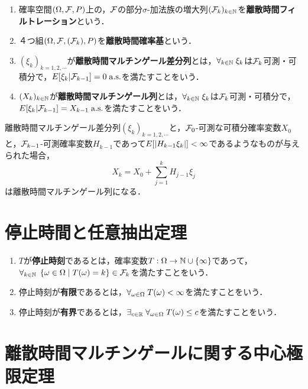 \documentclass[uplatex,dvipdfmx]{jsreport}
\begin{document}
\begin{definition}[filtration]\mbox{}
    \begin{enumerate}
        \item 確率空間$(\Omega,\mathcal{F},P)$上の，$\mathcal{F}$の部分$\sigma$-加法族の増大列$(\mathcal{F}_k)_{k\in\mathbb{N}}$を\textbf{離散時間フィルトレーション}という．
        \item ４つ組$(\Omega,\mathcal{F},(\mathcal{F}_k),P)$を\textbf{離散時間確率基}という．
        \item $(\xi_k)_{k=1,2,\cdots}$が\textbf{離散時間マルチンゲール差分列}とは，$\forall_{k\in\mathbb{N}}\;\xi_k$は$\mathcal{F}_k$可測・可積分で，$E[\xi_k|\mathcal{F}_{k-1}]=0\;\mathrm{a.s.}$を満たすことをいう．
        \item $(X_k)_{k\in\mathbb{N}}$が\textbf{離散時間マルチンゲール列}とは，$\forall_{k\in\mathbb{N}}\;\xi_k$は$\mathcal{F}_k$可測・可積分で，$E[\xi_k|\mathcal{F}_{k-1}]=X_{k-1}\;\mathrm{a.s.}$を満たすことをいう．
    \end{enumerate}
\end{definition}

\begin{lemma}
    離散時間マルチンゲール差分列$(\xi_k)_{k=1,2,\cdots}$と，$\mathcal{F}_0$-可測な可積分確率変数$X_0$と，$\mathcal{F}_{k-1}$-可測確率変数$H_{k-1}$であって$E[\lvert H_{k-1}\xi_k\rvert]<\infty$であるようなものが与えられた場合，
    \[X_k=X_0+\sum^k_{j=1}H_{j-1}\xi_j\]
    は離散時間マルチンゲール列になる．
\end{lemma}

\section{停止時間と任意抽出定理}

\begin{definition}\mbox{}
    \begin{enumerate}
        \item $T$が\textbf{停止時刻}であるとは，確率変数$T:\Omega\to\mathbb{N}\cup\{\infty\}$であって，$\forall_{k\in\mathbb{N}}\;\left\{\omega\in\Omega\mid T(\omega)=k\right\}\in\mathcal{F}_k$を満たすことをいう．
        \item 停止時刻が\textbf{有限}であるとは，$\forall_{\omega\in\Omega}\;T(\omega)<\infty$を満たすことをいう．
        \item 停止時刻が\textbf{有界}であるとは，$\exists_{c\in\mathbb{R}}\;\forall_{\omega\in\Omega}\;T(\omega)\le c$を満たすことをいう．
    \end{enumerate}
\end{definition}

\section{離散時間マルチンゲールに関する中心極限定理}
\end{document}
